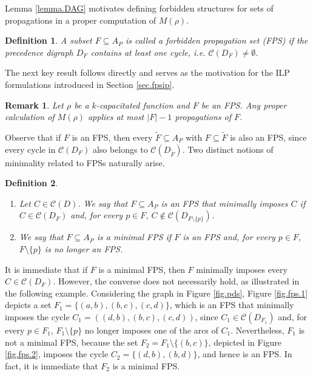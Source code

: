 \documentclass{article}
\newcommand{\CC}{{\mathscr C}}
\newtheorem{remark}{Remark}
\newtheorem{definition}{Definition}
\begin{document}
Lemma \ref{lemma.DAG} motivates defining forbidden structures for sets of propagations in a proper computation of $M(\rho)$.

\begin{definition}\label{def.FPS}
A subset $F \subseteq A_P$ is called a \emph{forbidden propagation set} (FPS) if the precedence digraph $D_F$ contains at least one  cycle, i.e. $\CC(D_F) \neq \emptyset$.
\end{definition}

The next key result follows directly and serves as the motivation for the ILP formulations introduced in Section \ref{sec.fpsip}.

\begin{remark}\label{remark.fps}
Let $\rho$ be a $k$-capacitated function and $F$ be an FPS.
Any proper calculation of $M(\rho)$ applies at most $|F| - 1$ propagations of $F$.
\end{remark}

Observe that if $F$ is an FPS, then every $\tilde F \subseteq A_P$ with $F \subseteq \tilde F$ is also an FPS, 
since every cycle in $\CC(D_F)$ also belongs to $\CC(D_{\tilde F})$.
Two distinct notions of minimality related to FPSs naturally arise.

\begin{definition}\label{def.minimal.FPS}
~ 
\begin{enumerate}
    \item Let $C \in \CC(D)$. We say that $F \subseteq A_P$ is an FPS that \emph{minimally imposes} $C$ if $C \in \CC(D_F)$ and, for every $p \in F$, $C \notin \CC(D_{F \setminus \{p\}})$. 
    \item We say that $F \subseteq A_P$ is a \emph{minimal FPS} if $F$ is an FPS and, for every $p \in F$, $F \setminus \{p\}$ is no longer an FPS.
\end{enumerate}
\end{definition}

It is immediate that if $F$ is a minimal FPS, then $F$ minimally imposes every $C \in \CC(D_F)$.
However, the converse does not necessarily hold, as illustrated in the following example.
Considering the graph in Figure \ref{fig.pds}, Figure \ref{fig.fps.1} depicts a set $F_1 = \{(a,b),(b,c),(c,d)\}$, which is an FPS that minimally imposes the cycle $C_1 = ((d,b),(b,c),(c,d))$, since $C_1 \in \CC(D_{F_1})$ and, for every $p \in F_1$, $F_1 \setminus \{p\}$ no longer imposes one of the arcs of $C_1$.
Nevertheless, $F_1$ is not a minimal FPS, because the set $F_2 = F_1 \setminus \{(b,c)\}$, depicted in Figure \ref{fig.fps.2}, imposes the cycle $C_2 = \{(d,b),(b,d)\}$, and hence is an FPS.
In fact, it is immediate that $F_2$ is a minimal FPS.
\end{document}
